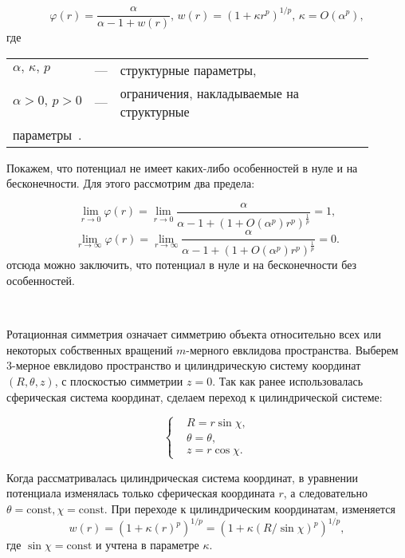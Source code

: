 \begin{equation}
\varphi (r) = \frac{\alpha}{\alpha - 1 + w(r)},\,  w(r) = (1+\kappa r^p)^{1/p},\, \kappa = O(\alpha ^p),
\end{equation}
где
\begin{center}
    \begin{tabular}{l c p{0.9\linewidth}}
$\alpha,\, \kappa,\, p$   & --- & структурные параметры, \\
$\alpha > 0,\, p > 0$     & --- & ограничения, накладываемые на структурные\\параметры~\cite{RaspopvaOssipkovJiang}.\\
  \end{tabular}
\end{center}

Покажем, что потенциал не имеет каких-либо особенностей в нуле и на бесконечности. Для этого рассмотрим два предела:

\begin{equation}
	\lim_{r \to 0} \varphi(r) = \lim_{r \to 0} \frac{\alpha}{\alpha - 1 + (1 + O(\alpha^p)r^p)^{\frac{1}{p}}} = 1,
\end{equation}
\begin{equation}
	\lim_{r \to \infty}\varphi(r) = \lim_{r \to \infty} \frac{\alpha}{\alpha - 1 + (1 + O(\alpha^p)r^p)^{\frac{1}{p}}} = 0.
\end{equation}
отсюда можно заключить, что потенциал в нуле и на бесконечности без особенностей.

~\par
Ротационная симметрия  означает симметрию объекта относительно всех или некоторых собственных вращений $m$-мерного евклидова пространства. Выберем 3-мерное евклидово пространство и цилиндрическую систему координат $(R, \theta, z)$, с плоскостью симметрии $z=0$. Так как ранее использовалась сферическая система координат, сделаем переход к цилиндрической системе:

\begin{equation}
\left\{ \begin{aligned}
& R = r \sin \chi, \\
& \theta = \theta, \\
& z = r \cos \chi.
\end{aligned}
\right.
\end{equation}

Когда рассматривалась цилиндрическая система координат, в уравнении потенциала изменялась только сферическая координата $r$, а следовательно $\theta = \text{const}, \chi = \text{const}$. При переходе к цилиндрическим координатам, изменяется $$w(r) = (1+\kappa (r)^p)^{1/p} = (1+\kappa (R/\sin \chi)^p)^{1/p},$$ где $\sin \chi = \text{const} $ и учтена в параметре $\kappa$.\\

